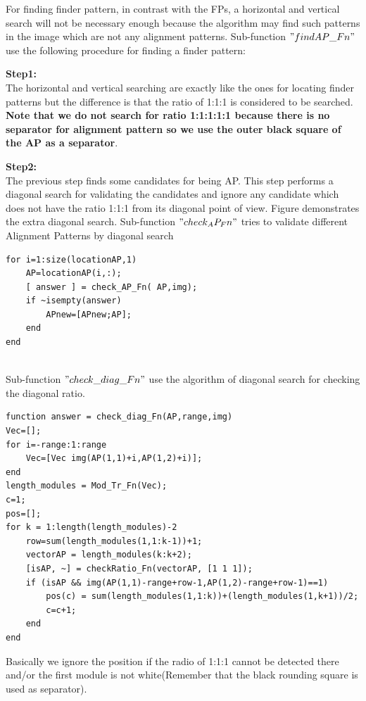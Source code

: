 For finding finder pattern, in contrast with the FPs, a horizontal and vertical search will not be necessary enough because the algorithm may find such patterns in the image which are not any alignment patterns. Sub-function $"findAP\_Fn"$ use the following procedure for finding a finder pattern:

\textbf{Step1:}\\ The horizontal and vertical searching are exactly like the ones for locating finder patterns but the difference is that the ratio of 1:1:1 is considered to be searched. \textbf{Note that we do not search for ratio 1:1:1:1:1 because there is no separator for alignment pattern so we use the outer black square of the AP as a separator}.



\textbf{Step2:}\\ The previous step finds some candidates for being AP. This step performs a diagonal search for validating the candidates and ignore any candidate which does not have the ratio 1:1:1 from its diagonal point of view. Figure demonstrates the extra diagonal search. Sub-function $"check_AP_Fn"$ tries to validate different Alignment Patterns by diagonal search

\begin{lstlisting}
for i=1:size(locationAP,1)
    AP=locationAP(i,:);
    [ answer ] = check_AP_Fn( AP,img);
    if ~isempty(answer)
        APnew=[APnew;AP];
    end
end
                   
\end{lstlisting}

Sub-function $"check\_diag\_Fn"$ use the algorithm of diagonal search for checking the diagonal ratio.

\begin{lstlisting}
function answer = check_diag_Fn(AP,range,img)
Vec=[];
for i=-range:1:range
    Vec=[Vec img(AP(1,1)+i,AP(1,2)+i)];
end
length_modules = Mod_Tr_Fn(Vec);
c=1;
pos=[];
for k = 1:length(length_modules)-2
    row=sum(length_modules(1,1:k-1))+1;
    vectorAP = length_modules(k:k+2);
    [isAP, ~] = checkRatio_Fn(vectorAP, [1 1 1]);
    if (isAP && img(AP(1,1)-range+row-1,AP(1,2)-range+row-1)==1)
        pos(c) = sum(length_modules(1,1:k))+(length_modules(1,k+1))/2;
        c=c+1;
    end
end            
\end{lstlisting}

Basically we ignore the position if the radio of 1:1:1 cannot be detected there and/or the first module is not white(Remember that the black rounding square is used as separator).

